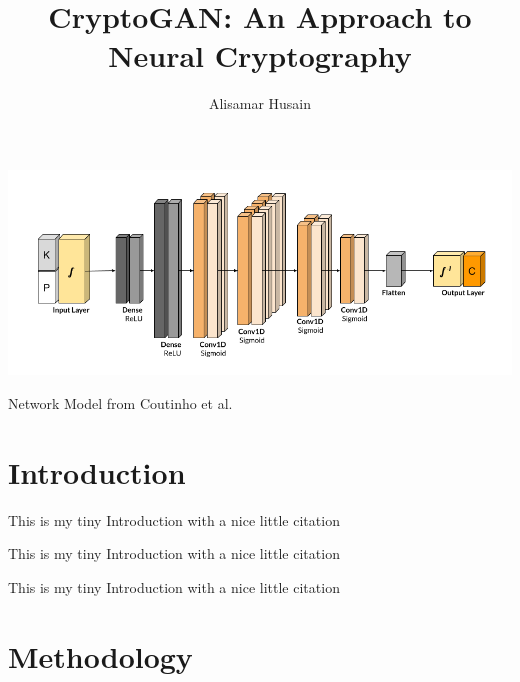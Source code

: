 \documentclass[12pt]{article}
\begin{document}
  \title{CryptoGAN: An Approach to Neural Cryptography}

  \author{Alisamar Husain}

  \begin{abstract}
    \lipsum[1]
  \end{abstract}
  
  \begin{teaserfigure}
    \includegraphics[width=\textwidth]{ref/netmodel}
    \caption{Network Model from Coutinho et al.}
    \label{fig:teaser}
  \end{teaserfigure}

  \maketitle
 
  \section{Introduction}
  This is my tiny Introduction with a nice 
  little citation \cite{visualloss}

  This is my tiny Introduction with a nice 
  little citation \cite{seminalanc}
  
  
  This is my tiny Introduction with a nice 
  little citation \cite{perfanc}

  \section{Methodology} 
  \lipsum
  
  
  
\end{document}
